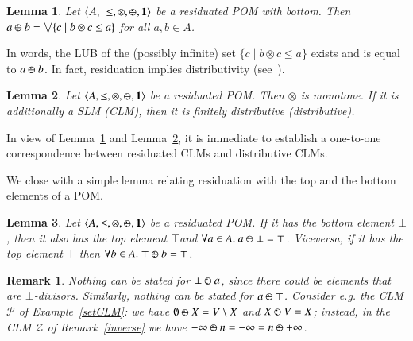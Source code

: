 \documentclass[a4paper]{elsarticle}
\newtheorem{remark}{Remark}
\newtheorem{lemma}{Lemma}
\newcommand{\monop}{\otimes}
\newcommand{\1}{\mathbf{1}}
\def\odiv{{ \ominus\hspace{-8pt}:}\;}
\begin{document}
\begin{lemma}\label{rclm1}
	Let $\langle A,$ $\leq, \otimes,  \odiv, \1 \rangle$ be a residuated POM with bottom.
	Then $a \mathbin{\odiv} b = \bigvee \{c \mid b \otimes c \leq a\}$ for all $a, b \in A$.
\end{lemma}

In words, the LUB of the (possibly infinite) set 
$\{c \mid b \otimes c \leq a\}$ exists and is equal to $a \mathbin{\odiv} b$.
%
In fact, residuation implies distributivity (see~\cite[Lemma 2.2]{ipl}).

\begin{lemma}\label{rclm2}
	Let $\langle A, \leq, \monop, \odiv, \1 \rangle$ be a residuated POM. 
	Then $\monop$ is monotone.
	If  it is additionally a SLM (CLM), then it is finitely distributive
	(distributive).
\end{lemma}

In view of Lemma~\ref{rclm1} and Lemma~\ref{rclm2}, it is immediate to
establish a one-to-one correspondence between residuated CLMs and distributive CLMs.

%

\smallskip
We close with a simple lemma relating residuation with the top and the bottom elements of a POM.

\begin{lemma}
	\label{someProps}
	Let $\langle A, \leq, \monop, \odiv, \1 \rangle$ be a residuated POM. 
	If it has the bottom element $\bot$, then it also has the top element $\top$and
	$\forall a \in A.\ a \mathbin{\odiv} \bot = \top$.
	Viceversa, if it has the top element $\top$ then
	$\forall b \in A.\ \top \mathbin{\odiv} b = \top$.
\end{lemma}

\begin{remark}
\label{usualNat}
	Nothing can be stated for $\bot \mathbin{\odiv} a$, since there could be elements that are 
	$\bot$-divisors. Similarly, nothing can be stated for $a \mathbin{\odiv} \top$.
	Consider e.g. the CLM $\mathcal{P}$ 
	of Example~\ref{setCLM}: we have $\emptyset \mathbin{\odiv} X = V\setminus X$
	and $X \mathbin{\odiv} V = X$; instead, in the CLM $\mathcal{Z}$ of Remark~\ref{inverse}
	we have ${-}\infty \mathbin{\odiv} n = {-}\infty = n \mathbin{\odiv} {+}\infty$.
\end{remark}
\end{document}
